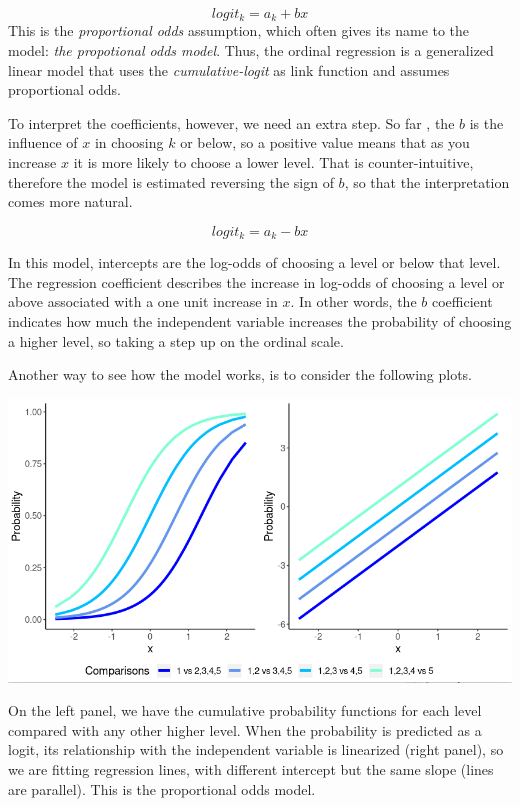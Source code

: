 \documentclass[
]{book}
\begin{document}
\[
logit_k=a_k+b x
\]
This is the \emph{proportional odds} assumption, which often gives its name to the model: \emph{the propotional odds model}. Thus, the ordinal regression is a generalized linear model that uses the \emph{cumulative-logit} as link function and assumes proportional odds.

To interpret the coefficients, however, we need an extra step. So far , the \(b\) is the influence of \(x\) in choosing \(k\) or below, so a positive value means that as you increase \(x\) it is more likely to choose a lower level. That is counter-intuitive, therefore the model is estimated reversing the sign of \(b\), so that the interpretation comes more natural.

\[
logit_k=a_k-b x
\]

In this model, intercepts are the log-odds of choosing a level or below that level. The regression coefficient describes the increase in log-odds of choosing a level or above associated with a one unit increase in \(x\). In other words, the \(b\) coefficient indicates how much the independent variable increases the probability of choosing a higher level, so taking a step up on the ordinal scale.

Another way to see how the model works, is to consider the following plots.

\includegraphics[width=11.64in]{bookletpics/3_ordinal_probs}

On the left panel, we have the cumulative probability functions for each level compared with any other higher level. When the probability is predicted as a logit, its relationship with the independent variable is linearized (right panel), so we are fitting regression lines, with different intercept but the same slope (lines are parallel). This is the proportional odds model.
\end{document}

